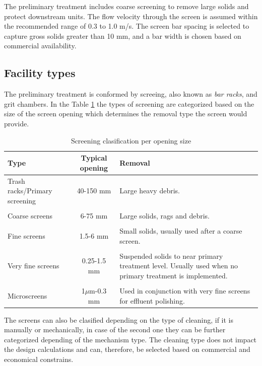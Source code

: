 \documentclass[12pt]{article}
\begin{document}
The preliminary treatment includes coarse screening to remove large solids and protect downstream units.
The flow velocity through the screen is assumed within the recommended range of 0.3 to 1.0 m/s.
The screen bar spacing is selected to capture gross solids greater than 10 mm, and a bar width is
chosen based on commercial availability.

\subsection{Facility types}
\label{sec:preliminary_facility_types}
The preliminary treatment is conformed by screeing, also known as \textit{bar racks}, 
and grit chambers. In the Table \ref{tab:screening_types} the types 
of screening are categorized based on the size of the screen 
opening which determines the removal type the screen would provide. 

\begin{table}[h]
  \centering
  \caption{Screening clasification per opening size \cite{davis2010water}}
  \label{tab:screening_types}
  \begin{tabular}{|l|c|p{6cm}|}
  \hline
  \textbf{Type} & \textbf{Typical opening} & \textbf{Removal} \\
  \hline
  Trash racks/Primary screening & 40-150 mm & Large heavy debris.\\
  & & \\
  Coarse screens & 6-75 mm & Large solids, rags and debris.\\
  & & \\
  Fine screens & 1.5-6 mm & Small solids, usually used after a coarse screen.\\
  & & \\
  Very fine screens & 0.25-1.5 mm & Suspended solids to near primary treatment level. Usually used when no primary treatment is implemented.\\
  & & \\
  Microscreens & 1$\mu$m-0.3 mm & Used in conjunction with very fine screens for effluent polishing. \\
  \hline
  \end{tabular}
\end{table}

The screens can also be clasified depending on the type of cleaning, if it is manually 
or mechanically, in case of the second one they can be further categorized depending 
of the mechanism type. The cleaning type does not impact the design calculations and can, 
therefore, be selected based on commercial and economical constrains.
\end{document}
